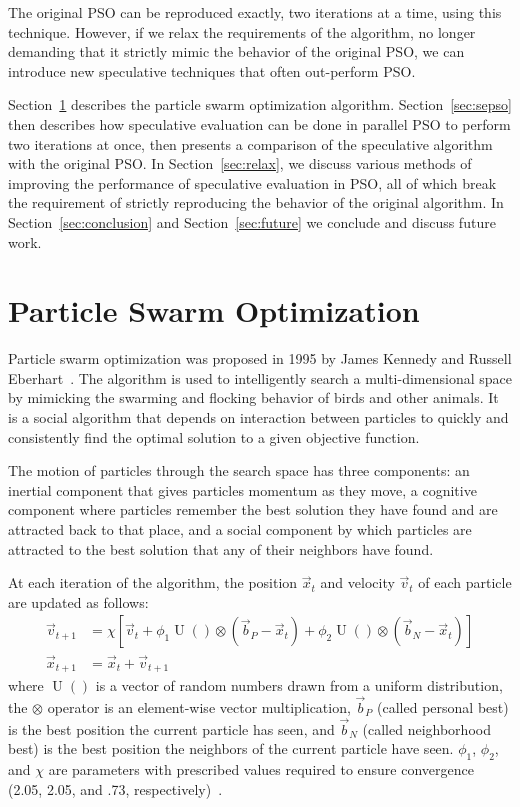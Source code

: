 \documentclass[journal,letterpaper]{IEEEtran}
\renewcommand{\sec}[1]{Section~\ref{sec:#1}}
\DeclareMathOperator{\URand}{U}
\providecommand{\ppos}{\ensuremath{\Vec{x}}}
\providecommand{\pvel}{\ensuremath{\Vec{v}}}
\providecommand{\nbest}{\ensuremath{\Vec{b}_N}}
\providecommand{\pbest}{\ensuremath{\Vec{b}_P}}
\providecommand{\constriction}{\ensuremath{\chi}}
\providecommand{\coeff}{\ensuremath{\phi}}
\begin{document}
The original PSO can be reproduced exactly, two iterations at a time, using
this technique.  However, if we relax the requirements of the algorithm, no
longer demanding that it strictly mimic the behavior of the original PSO, we
can introduce new speculative techniques that often out-perform PSO.  

\sec{pso} describes the particle swarm optimization algorithm.  \sec{sepso}
then describes how speculative evaluation can be done in parallel PSO to
perform two iterations at once, then presents a comparison of the speculative
algorithm with the original PSO.  In \sec{relax}, we discuss various methods of
improving the performance of speculative evaluation in PSO, all of which break
the requirement of strictly reproducing the behavior of the original algorithm.
In \sec{conclusion} and \sec{future} we conclude and discuss future work.

\section{Particle Swarm Optimization}
\label{sec:pso}

Particle swarm optimization was proposed in 1995 by James Kennedy and Russell
Eberhart~\cite{kennedy-icnn95}.  The algorithm is used to intelligently search
a multi-dimensional space by mimicking the swarming and flocking behavior of
birds and other animals. It is a social algorithm that depends on interaction
between particles to quickly and consistently find the optimal solution to a
given objective function.

The motion of particles through the search space has three components: an
inertial component that gives particles momentum as they move, a cognitive
component where particles remember the best solution they have found and are
attracted back to that place, and a social component by which particles are
attracted to the best solution that any of their neighbors have found.

At each iteration of the algorithm, the position $\ppos_t$ and velocity
$\pvel_t$ of each particle are updated as follows:
\begin{align}
\label{eq:velupdate}
	\pvel_{t+1} &=
		\constriction \left[ \pvel_t +
			\coeff_1\URand()\otimes(\pbest - \ppos_t) +
			\coeff_2\URand()\otimes(\nbest - \ppos_t)
		\right] \\
\label{eq:posupdate}
	\ppos_{t+1} &= \ppos_t + \pvel_{t+1}
\end{align}
where \( \URand() \) is a vector of random numbers drawn from a uniform
distribution, the \( \otimes \) operator is an element-wise vector
multiplication, $\pbest$ (called personal best) is the best position the
current particle has seen, and $\nbest$ (called neighborhood best) is the best
position the neighbors of the current particle have seen.  \( \coeff_1 \), \(
\coeff_2 \), and \( \constriction \) are parameters with prescribed values
required to ensure convergence (2.05, 2.05, and .73,
respectively)~\cite{clerc-tec02}.
\end{document}
